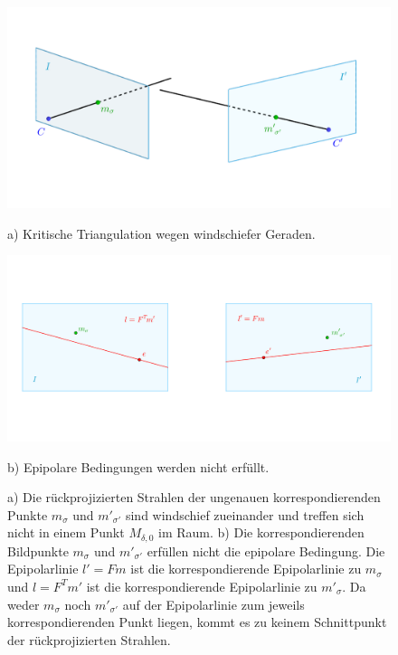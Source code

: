 \begin{figure}[!htb]
	\includegraphics[width=\linewidth]{images/problemTriangulation_beschriftet.png}
	\caption[Kritische Triangulation: windschiefe Geraden]{a) Kritische Triangulation wegen windschiefer Geraden.}
	\label{fig:ProblemTraingulation}
	\endminipage\hfill
	\includegraphics[width=\linewidth]{images/SampsAppx.png}
	\caption[Epipolare Bedingung wird nicht erfüllt]{b) Epipolare Bedingungen werden nicht erfüllt.}
	\label{fig:lFm}
	\endminipage\hfill
	\caption[Problemstellung für die Triangulation im real Beispiel]{ a) Die rückprojizierten Strahlen der ungenauen korrespondierenden Punkte $m_\sigma$ und $m'_{\sigma'}$ sind windschief zueinander und treffen sich nicht in einem Punkt $M_{\delta,0}$ im Raum. b) Die korrespondierenden Bildpunkte $m_\sigma$ und $m'_{\sigma'}$ erfüllen nicht die epipolare Bedingung. Die Epipolarlinie $l' = Fm$ ist die korrespondierende Epipolarlinie zu $m_\sigma$ und $l = F^Tm'$ ist die korrespondierende Epipolarlinie zu $m'_{\sigma}$. Da weder $m_\sigma$ noch $m'_{\sigma'}$ auf der Epipolarlinie zum jeweils korrespondierenden Punkt liegen, kommt es zu keinem Schnittpunkt der rückprojizierten Strahlen.}
\end{figure}


